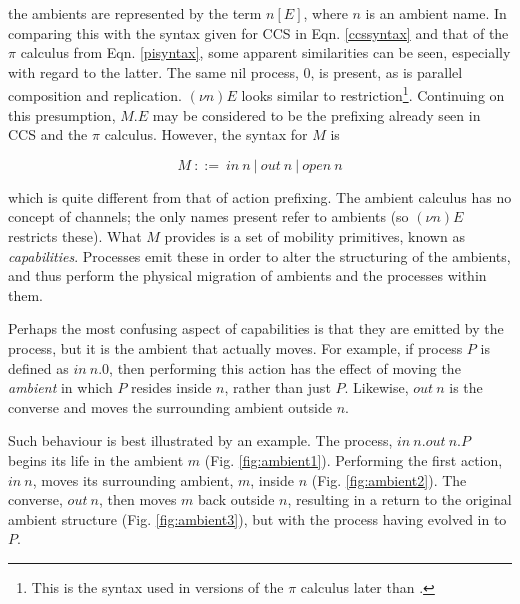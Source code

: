 \noindent the ambients are represented by the term $n[E]$, where $n$
is an ambient name.  In comparing this with the syntax given for CCS
in Eqn. \ref{ccssyntax} and that of the $\pi$ calculus from Eqn.
\ref{pisyntax}, some apparent similarities can be seen, especially
with regard to the latter.  The same nil process, $0$, is present, as
is parallel composition and replication.  $(\nu n)E$ looks similar to
restriction\footnote{This is the syntax used in versions of the $\pi$
  calculus later than \cite{funcproc}.}.  Continuing on this
presumption, $M.E$ may be considered to be the prefixing already seen
in CCS and the $\pi$ calculus.  However, the syntax for $M$ is

\begin{equation}
\label{ambsyntaxcap}
  M\ ::=\ 
  in\ n\ |\
  out\ n\ | \
  open\ n
\end{equation}

\noindent which is quite different from that of action prefixing.  The
ambient calculus has no concept of channels; the only names present
refer to ambients (so $(\nu n)E$ restricts these).  What $M$ provides
is a set of mobility primitives, known as \emph{capabilities}.
Processes emit these in order to alter the structuring of the
ambients, and thus perform the physical migration of ambients and the
processes within them.

Perhaps the most confusing aspect of capabilities is that they are
emitted by the process, but it is the ambient that actually moves.
For example, if process $P$ is defined as $in\ n.0$, then performing
this action has the effect of moving the \emph{ambient} in which $P$
resides inside $n$, rather than just $P$.  Likewise, $out\ n$ is the
converse and moves the surrounding ambient outside $n$.

Such behaviour is best illustrated by an example. The process, $in\
n.out\ n.P$ begins its life in the ambient $m$
(Fig. \ref{fig:ambient1}).  Performing the first action, $in\ n$,
moves its surrounding ambient, $m$, inside $n$
(Fig. \ref{fig:ambient2}).  The converse, $out\ n$, then moves $m$
back outside $n$, resulting in a return to the original ambient
structure (Fig. \ref{fig:ambient3}), but with the process having
evolved in to $P$.


